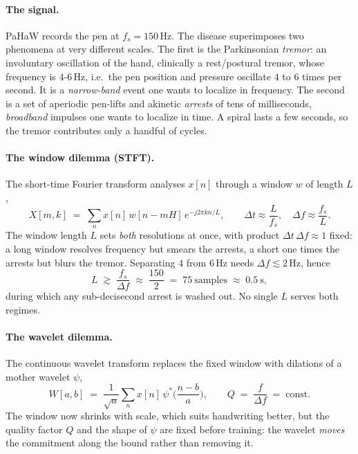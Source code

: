 \documentclass{article}
\begin{document}
\paragraph{The signal.}
PaHaW records the pen at $f_s=150$\,Hz. The disease superimposes two phenomena at very
different scales. The first is the Parkinsonian \emph{tremor}: an involuntary
oscillation of the hand, clinically a rest/postural tremor, whose frequency is
$4$-$6$\,Hz, i.e.\ the pen position and pressure oscillate $4$ to $6$ times per
second. It is a \emph{narrow-band} event one wants to localize in frequency. The
second is a set of aperiodic pen-lifts and akinetic \emph{arrests} of tens of
milliseconds, \emph{broadband} impulses one wants to localize in time. A spiral lasts
a few seconds, so the tremor contributes only a handful of cycles.

\paragraph{The window dilemma (STFT).}
The short-time Fourier transform analyses $x[n]$ through a window $w$ of length $L$,
\begin{equation}
X[m,k]\;=\;\sum_{n} x[n]\,w[n-mH]\,e^{-j2\pi kn/L},
\qquad
\Delta t \approx \frac{L}{f_s},\quad \Delta f \approx \frac{f_s}{L}.
\label{eq:stft}
\end{equation}
The window length $L$ sets \emph{both} resolutions at once, with product
$\Delta t\,\Delta f \approx 1$ fixed: a long window resolves frequency but smears the
arrests, a short one times the arrests but blurs the tremor. Separating $4$ from
$6$\,Hz needs $\Delta f\lesssim 2$\,Hz, hence
\begin{equation}
L \;\gtrsim\; \frac{f_s}{\Delta f} \;\approx\; \frac{150}{2} \;=\; 75~\text{samples}
\;\approx\; 0.5~\text{s},
\label{eq:wall}
\end{equation}
during which any sub-decisecond arrest is washed out. No single $L$ serves both
regimes.

\paragraph{The wavelet dilemma.}
The continuous wavelet transform replaces the fixed window with dilations of a mother
wavelet $\psi$,
\begin{equation}
W[a,b]\;=\;\frac{1}{\sqrt{a}}\sum_{n} x[n]\,\psi^{*}\!\Big(\frac{n-b}{a}\Big),
\qquad
Q \;=\; \frac{f}{\Delta f}\;=\;\text{const}.
\label{eq:cwt}
\end{equation}
The window now shrinks with scale, which suits handwriting better, but the quality
factor $Q$ and the shape of $\psi$ are fixed before training: the wavelet \emph{moves}
the commitment along the bound rather than removing it.
\end{document}
